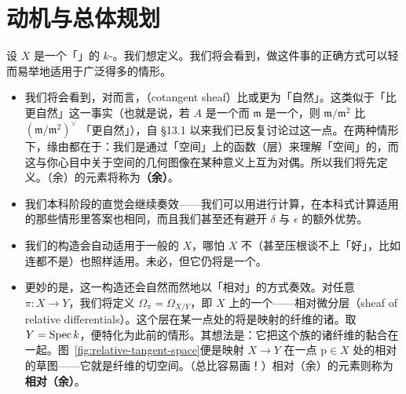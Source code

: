 
\section{动机与总体规划}

设 $X$ 是一个「\trSmooth」的 $k$-\trVariety。我们想定义\trTangentBundle。我们将会看到，做这件事的正确方式可以轻而易举地适用于广泛得多的情形。

\begin{itemize}[leftmargin=2.6em,itemsep=2pt,topsep=3pt]
\item 我们将会看到，对\trScheme{}而言，\trCotangentSheaf（cotangent sheaf）比\trTangentBundle{}或\trTangentSheaf{}更为「自然」。这类似于「\trZariski{}\trCotangentSpace{}比\trTangentSpace{}更自然」这一事实（也就是说，若 $A$ 是一个\trRing{}而 $\mathfrak{m}$ 是一个\trMaximalIdeal，则 $\mathfrak{m}/\mathfrak{m}^2$ 比 $(\mathfrak{m}/\mathfrak{m}^2)^{\vee}$ 「更自然」），自 \S13.1 以来我们已反复讨论过这一点。在两种情形下，缘由都在于：我们是通过「空间」上的函数（层）来理解「空间」的，而这与你心目中关于空间的几何图像在某种意义上互为对偶。所以我们将先定义\trCotangentSheaf。（余）\trTangentSpace{}的元素将称为\textbf{（余）\trTangentVector}。
\item 我们本科阶段的直觉会继续奏效——我们可以用\trJacobianMatrix{}进行计算，在本科式计算适用的那些情形里答案也相同，而且我们甚至还有避开 $\delta$ 与 $\epsilon$ 的额外优势。
\item 我们的构造会自动适用于一般的 $X$，哪怕 $X$ 不\trSmooth（甚至压根谈不上「好」，比如连\trFiniteType{}都不是）也照样适用。\trCotangentSheaf{}未必\trLocallyFree，但它仍将是一个\trQCSheaf。
\item 更妙的是，这一构造还会自然而然地以「相对」的方式奏效。对任意 $\pi\colon X\to Y$，我们将定义 $\Omega_\pi=\Omega_{X/Y}$，即 $X$ 上的一个\trQCSheaf——相对微分层（sheaf of relative differentials）。这个层在某一点处的\trFiber{}将是映射的纤维的诸\trCotangentVector。取 $Y=\operatorname{Spec} k$，便特化为此前的情形。其想法是：它把这个族的诸纤维的\trCotangentSheaf{}黏合在一起。图~\ref{fig:relative-tangent-space}便是映射 $X\to Y$ 在一点 $\mathrm{p}\in X$ 处的相对\trTangentSpace{}的草图——它就是纤维的切空间。（\trTangentSpace{}总比\trCotangentSpace{}容易画！）相对（余）\trTangentSpace{}的元素则称为\textbf{相对（余）\trTangentVector}。
\end{itemize}


